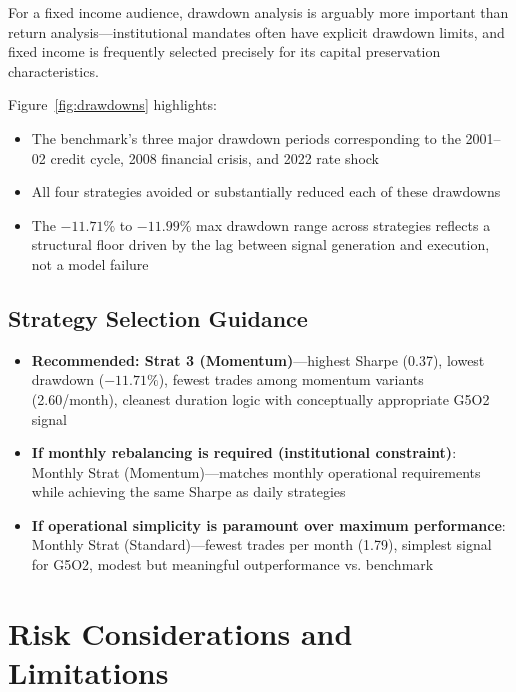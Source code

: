 \documentclass[11pt]{article}
\begin{document}
For a fixed income audience, drawdown analysis is arguably more important than return analysis---institutional mandates often have explicit drawdown limits, and fixed income is frequently selected precisely for its capital preservation characteristics.

Figure~\ref{fig:drawdowns} highlights:
\begin{itemize}
    \item The benchmark's three major drawdown periods corresponding to the 2001--02 credit cycle, 2008 financial crisis, and 2022 rate shock

    \item All four strategies avoided or substantially reduced each of these drawdowns

    \item The $-11.71\%$ to $-11.99\%$ max drawdown range across strategies reflects a structural floor driven by the lag between signal generation and execution, not a model failure
\end{itemize}

\subsection{Strategy Selection Guidance}

\begin{itemize}
    \item \textbf{Recommended: Strat 3 (Momentum)}---highest Sharpe (0.37), lowest drawdown ($-11.71\%$), fewest trades among momentum variants (2.60/month), cleanest duration logic with conceptually appropriate G5O2 signal

    \item \textbf{If monthly rebalancing is required (institutional constraint)}: Monthly Strat (Momentum)---matches monthly operational requirements while achieving the same Sharpe as daily strategies

    \item \textbf{If operational simplicity is paramount over maximum performance}: Monthly Strat (Standard)---fewest trades per month (1.79), simplest signal for G5O2, modest but meaningful outperformance vs. benchmark
\end{itemize}

\section{Risk Considerations and Limitations}
\end{document}
